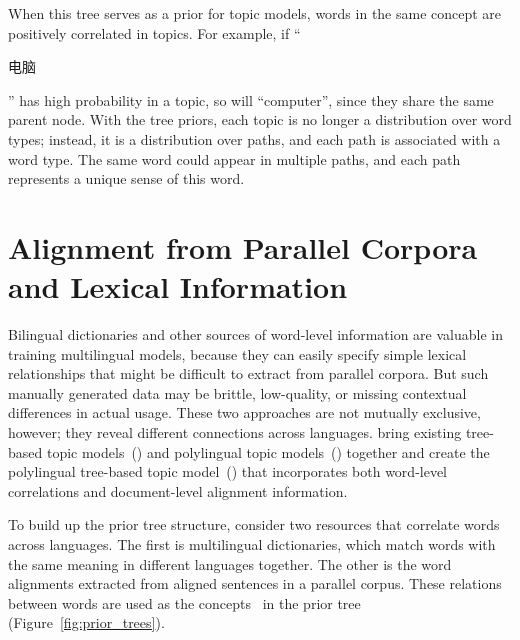 
When this tree serves as a prior for topic models, words in the same
concept are positively correlated in topics.  For example, if
``\begin{CJK*}{UTF8}{gbsn}电脑\end{CJK*}'' has high probability in a
  topic, so will ``computer'', since they share the same parent
  node. With the tree priors, each topic is no longer a distribution
  over word types; instead, it is a distribution over paths, and each
  path is associated with a word type.  The same word could appear in
  multiple paths, and each path represents a unique sense of this
  word.




\section{Alignment from Parallel Corpora and Lexical Information}

Bilingual dictionaries and other sources of word-level information are 
valuable in training multilingual models, because they can easily specify 
simple lexical relationships that might be difficult to extract from parallel corpora.
But such manually generated data may be brittle, low-quality, or missing contextual differences in actual usage.
These two approaches are not mutually exclusive, however; they reveal
different connections across languages. \citet{hu-14} bring existing
tree-based topic models~(\tlda{}) and polylingual topic
models~(\plda{}) together and create the polylingual tree-based topic
model~(\ptlda{}) that incorporates both word-level correlations and
document-level alignment information.

To build up the prior tree structure, \citet{hu-14} consider two
resources that correlate words across languages. The first is
multilingual dictionaries, which match words with the same meaning in
different languages together. The other is the word alignments
extracted from aligned sentences in a parallel corpus. These relations
between words are used as the concepts~\citep{Bhattacharya-2006} in
the prior tree (Figure~\ref{fig:prior_trees}).

